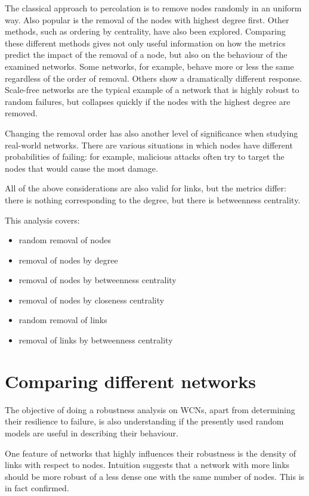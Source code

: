 \documentclass[a4paper,11pt,twoside,openright]{memoir}
\begin{document}
The classical approach to percolation is to remove nodes randomly in an
uniform way. Also popular is the removal of the nodes with highest
degree first. Other methods, such as ordering by centrality, have also
been explored. Comparing these different methods gives not only useful
information on how the metrics predict the impact of the removal of a node,
but also on the behaviour of the examined networks. Some
networks, for example, behave more or less the same regardless of the
order of removal. Others show a dramatically different response.
Scale-free networks are the typical example of a network that is highly
robust to random failures, but collapses quickly if the nodes with the
highest degree are removed.

Changing the removal order has also another level of significance when
studying real-world networks. There are various situations in which
nodes have different probabilities of failing: for example, malicious
attacks often try to target the nodes that would cause the most damage.

All of the above considerations are also valid for links, but the
metrics differ: there is nothing corresponding to the degree, but there
is betweenness centrality.

This analysis covers:

\begin{itemize}
  \item random removal of nodes
  \item removal of nodes by degree
  \item removal of nodes by betweenness centrality
  \item removal of nodes by closeness centrality
  \item random removal of links
  \item removal of links by betweenness centrality
\end{itemize}

\section{Comparing different networks}\label{comparing-different-networks}

The objective of doing a robustness analysis on WCNs, apart from
determining their resilience to failure, is also understanding if the
presently used random models are useful in describing their behaviour.

One feature of networks that highly influences their robustness is the
density of links with respect to nodes. Intuition suggests that a
network with more links should be more robust of a less dense one with
the same number of nodes. This is in fact confirmed.
\end{document}

